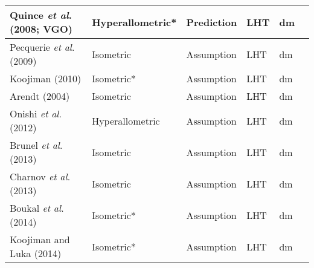 \documentclass{article}
\begin{document}
\begin{table}[]
\begin{tabularx}{\textwidth}{|l|l|l|l|X|X|}
    Quince \textit{et al}. (2008; VGO)      & Hyperallometric* & Prediction         & LHT                   & dm                                                                                                                                                    \\ \hline
    Pecquerie \textit{et al}. (2009)        & Isometric        & Assumption         & LHT                   & dm                                                                                                                                                    \\ \hline
    Koojiman (2010)                         & Isometric*       & Assumption         & LHT                   & dm                                                                                                                                                    \\ \hline
    Arendt (2004)                           & Isometric        & Assumption         & LHT                   & dm                                                                                                                                                    \\ \hline
    Onishi \textit{et al}. (2012)           & Hyperallometric  & Assumption         & LHT                   & dm                                                                                                                                                    \\ \hline
    Brunel \textit{et al}. (2013)           & Isometric        & Assumption         & LHT                   & dm                                                                                                                                                    \\ \hline
    Charnov \textit{et al}. (2013)          & Isometric        & Assumption         & LHT                   & dm                                                                                                                                                    \\ \hline
    Boukal \textit{et al}. (2014)           & Isometric*       & Assumption         & LHT                   & dm                                                                                                                                                    \\ \hline
    Koojiman and Luka (2014)                & Isometric*       & Assumption         & LHT                   & dm                                                                                                                                                    \\ \hline

\end{tabularx}
\end{table}
\end{document}
